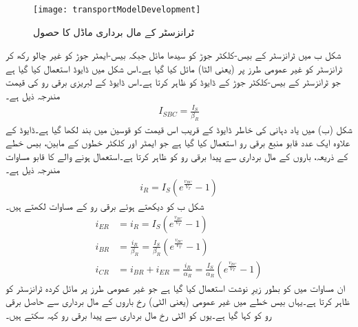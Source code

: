 \begin{figure}
\centering
\texttt{[image: transportModelDevelopment]}
\caption{ ٹرانزسٹر کے مال برداری ماڈل کا حصول}
\label{شکل_ٹرانزسٹر کے مال برداری ماڈل کا حصول}
\end{figure}
شکل  ب میں ٹرانزسٹر کے بیس-کلکٹر جوڑ کو سیدھا مائل جبکہ بیس-ایمٹر  جوڑ کو غیر چالو رکھ کر ٹرانزسٹر کو غیر عمومی طرز پر (یعنی الٹا) مائل کیا گیا ہے۔اس شکل میں ڈایوڈ  استعمال کیا گیا ہے جو ٹرانزسٹر کے بیس-کلکٹر جوڑ کے ڈایوڈ کو ظاہر کرتا ہے۔اس ڈایوڈ کے لبریزی برقی رو  کی قیمت مندرجہ ذیل ہے۔
\begin{align}
I_{SBC}=\frac{I_S}{\beta_R}
\end{align}
شکل (ب) میں یاد دہانی کی خاطر ڈایوڈ کے قریب اس قیمت کو قوسین میں بند لکھا گیا ہے۔ڈایوڈ کے علاوہ ایک عدد قابو منبع برقی رو استعمال کیا گیا ہے جو ایمٹر اور کلکٹر  خطوں کے مابین، بیس خطے کے ذریعہ، باروں کے مال برداری سے پیدا برقی رو کو ظاہر کرتا ہے۔استعمال ہونے والے   کا قابو مساوات مندرجہ ذیل ہے۔
\begin{align}
i_R=I_S \left (e^{\frac{v_{BC}}{V_T}}-1 \right )
\end{align}
شکل  ب کو دیکھتے ہوئے برقی رو کے مساوات لکھتے ہیں۔
\begin{align} \label{مساوات_ٹرانزسٹر_مال_برداری_الٹے_رو}
i_{ER}&=i_R=I_S \left (e^{\frac{v_{BC}}{V_T}}-1 \right )\\
i_{BR}&=\frac{i_R}{\beta_R}=\frac{I_S}{\beta_R} \left (e^{\frac{v_{BC}}{V_T}}-1 \right ) \\
i_{CR}&=i_{BR}+i_{ER}=\frac{i_R}{\alpha_R}=\frac{I_S}{\alpha_R} \left (e^{\frac{v_{BC}}{V_T}}-1 \right )
\end{align}
ان مساوات میں  کو بطور زیرِ نوشت استعمال کیا گیا ہے جو غیر عمومی طرز پر مائل کردہ ٹرانزسٹر کو ظاہر کرتا ہے۔یہاں بیس خطے میں غیر عمومی (یعنی الٹی) رخ باروں کے مال برداری سے حاصل برقی رو کو  کہا گیا ہے۔یوں  کو الٹی رخ مال برداری سے پیدا برقی رو کہہ سکتے ہیں۔

